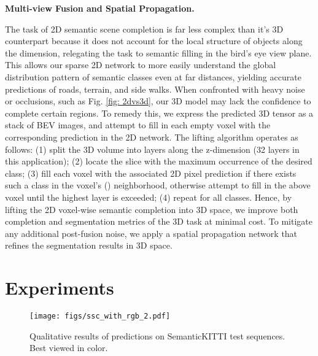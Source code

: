 \documentclass{article}
\begin{document}
\textbf{Multi-view Fusion and Spatial Propagation.} 

The task of 2D semantic scene completion is far less complex than it's 3D counterpart because it does not account for the local structure of objects along the  dimension, relegating the task to semantic filling in the bird's eye view plane. This allows our sparse 2D network to more easily understand the global distribution pattern of semantic classes even at far distances, yielding accurate predictions of roads, terrain, and side walks. When confronted with heavy noise or occlusions, such as Fig. \ref{fig: 2dvs3d}, our 3D model may lack the confidence to complete certain regions. To remedy this, we express the predicted 3D tensor as a stack of BEV images, and attempt to fill in each empty voxel with the corresponding prediction in the 2D network. The lifting algorithm operates as follows: (1) split the 3D volume into layers along the z-dimension (32 layers in this application); (2) locate the slice with the maximum occurrence of the desired class; (3) fill each voxel with the associated 2D pixel prediction if there exists such a class in the voxel's  () neighborhood, otherwise attempt to fill in the above voxel until the highest layer is exceeded; (4) repeat for all classes. Hence, by lifting the 2D voxel-wise semantic completion into 3D space, we improve both completion and segmentation metrics of the 3D task at minimal cost. To mitigate any additional post-fusion noise, we apply a spatial propagation network that refines the segmentation results in 3D space.




\section{Experiments}
\label{sec:result}

\begin{figure}[htb]
\vspace{-10px}
    \centering
    \texttt{[image: figs/ssc\_with\_rgb\_2.pdf]}
    \captionsetup{font=scriptsize,labelfont=scriptsize}
    \caption{Qualitative results of predictions on SemanticKITTI test sequences. Best viewed in color.}
    \label{fig:qualitative_result}
\vspace{-10px}
\end{figure}
\end{document}
